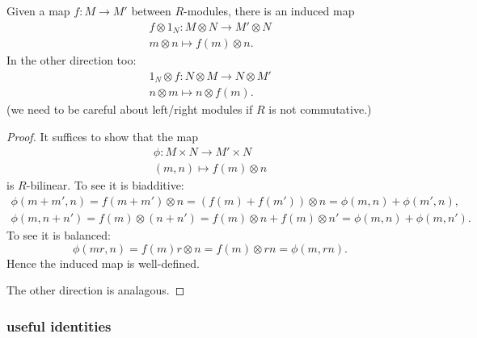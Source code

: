 \documentclass[12pt]{article}
\begin{document}
\begin{lemma}[functoriality]
\label{lemma_functoriality_of_tensor_product}
	Given a map $f:M\to M'$ between $R$-modules, there is an induced map 
	\begin{gather*}
		f\otimes 1_{N}: M\otimes N \to M'\otimes N \\
		m\otimes n \mapsto f(m) \otimes n.
	\end{gather*}
	In the other direction too:
	\begin{gather*}
		1_N\otimes f: N\otimes M \to N\otimes M' \\
		n\otimes m \mapsto n\otimes f(m).
	\end{gather*}
	(we need to be careful about left/right modules if $R$ is not commutative.)
\end{lemma}
\begin{proof}
	It suffices to show that the map 
	\begin{gather*}
		\phi: M\times N \to M'\times N \\
		(m,n) \mapsto f(m)\otimes n
	\end{gather*}
	is $R$-bilinear. To see it is biadditive:
	\begin{gather*}
		\phi(m+m',n) = f(m+m')\otimes n = (f(m)+f(m'))\otimes n = \phi(m,n) + \phi(m',n), \\
		\phi(m, n+n') = f(m)\otimes (n+n') = f(m)\otimes n + f(m)\otimes n' = \phi(m,n) + \phi(m,n').
	\end{gather*}
	To see it is balanced:
	\begin{equation*}
		\phi(mr, n) = f(m)r\otimes n = f(m)\otimes rn = \phi(m,rn).
	\end{equation*}
	Hence the induced map is well-defined.

	The other direction is analagous.
\end{proof}

\subsubsection{useful identities} %
\end{document}
